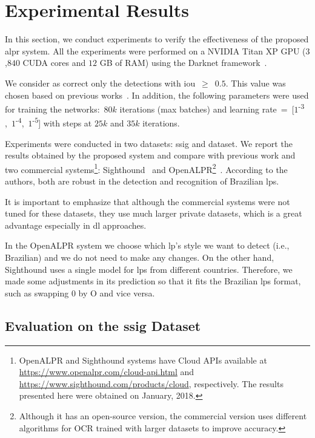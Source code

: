 \section{Experimental Results}
\label{sec:results}

In this section, we conduct experiments to verify the effectiveness of the proposed \gls*{alpr} system. All the experiments were performed on a NVIDIA Titan XP GPU ($3$,$840$ CUDA cores and $12$ GB of RAM) using the Darknet framework~\cite{darknet13}.

We consider as correct only the detections with \gls*{iou}~$\geq$~$0.5$. This value was chosen based on previous works~\cite{montazzolli2017,li2017towards,yuan2017}. In addition, the following parameters were used for training the networks:~$80k$ iterations (max batches) and learning rate~=~[$1$\textsuperscript{-$3$},~$1$\textsuperscript{-$4$},~$1$\textsuperscript{-$5$}] with steps at $25k$ and $35k$ iterations.

Experiments were conducted in two datasets: \gls*{ssig} and \acrshort*{dataset}. We report the results obtained by the proposed system and compare with previous work and two commercial systems\footnote{OpenALPR and Sighthound systems have Cloud APIs available at \url{https://www.openalpr.com/cloud-api.html} and \url{https://www.sighthound.com/products/cloud}, respectively. The results presented here were obtained on January, 2018.}: Sighthound~\cite{masood2017sighthound} and OpenALPR\footnote{Although it has an open-source version, the commercial version uses different algorithms for OCR trained with larger datasets to improve accuracy.}~\cite{openalpr}. According to the authors, both are robust in the detection and recognition of Brazilian \glspl*{lp}. 

It is important to emphasize that although the commercial systems were not tuned for these datasets, they use much larger private datasets, which is a great advantage especially in \gls*{dl} approaches. 

In the OpenALPR system we choose which \gls*{lp}'s style we want to detect (i.e., Brazilian) and we do not need to make any changes. On the other hand, Sighthound uses a single model for \glspl*{lp} from different countries. Therefore, we made some adjustments in its prediction so that it fits the Brazilian \glspl*{lp} format, such as swapping $0$ by O and vice versa.

\subsection{Evaluation on the \gls*{ssig} Dataset}
\label{ssig:results_ssig}

